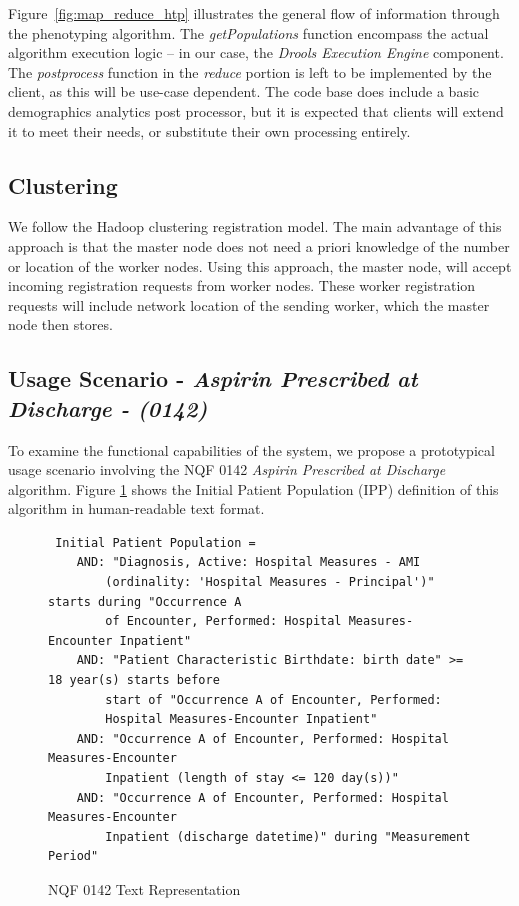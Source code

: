 \documentclass{amia}
\begin{document}
Figure~\ref{fig:map_reduce_htp} illustrates the general flow of information through the phenotyping algorithm. The \textit{getPopulations} function encompass the actual algorithm execution logic -- in our case, the \textit{Drools Execution Engine} component. The \textit{postprocess} function in the \textit{reduce} portion is left to be implemented by the client, as this will be use-case dependent. The code base does include a basic demographics analytics post processor, but it is expected that clients will extend it to meet their needs, or substitute their own processing entirely.

\subsection*{Clustering}
We follow the Hadoop clustering registration model\cite{wang2009hadoop}. The main advantage of this approach is that the master node does not need a priori knowledge of the number or location of the worker nodes. Using this approach, the master node, will accept incoming registration requests from worker nodes. These worker registration requests will include network location of the sending worker, which the master node then stores.

\subsection*{Usage Scenario - \textit{Aspirin Prescribed at Discharge - (0142)}}
To examine the functional capabilities of the system, we propose a prototypical usage scenario involving the NQF 0142 \textit{Aspirin Prescribed at Discharge} algorithm. Figure \ref{fig:0142_IPP_text} shows the Initial Patient Population (IPP) definition of this algorithm in human-readable text format.

\begin{figure}[H]
\begin{verbatim}
 Initial Patient Population =
    AND: "Diagnosis, Active: Hospital Measures - AMI 
        (ordinality: 'Hospital Measures - Principal')" starts during "Occurrence A
        of Encounter, Performed: Hospital Measures-Encounter Inpatient"
    AND: "Patient Characteristic Birthdate: birth date" >= 18 year(s) starts before
        start of "Occurrence A of Encounter, Performed: 
        Hospital Measures-Encounter Inpatient"
    AND: "Occurrence A of Encounter, Performed: Hospital Measures-Encounter
        Inpatient (length of stay <= 120 day(s))"
    AND: "Occurrence A of Encounter, Performed: Hospital Measures-Encounter
        Inpatient (discharge datetime)" during "Measurement Period"
\end{verbatim}
\caption{NQF 0142 Text Representation} 
\label{fig:0142_IPP_text}
\end{figure}
\end{document}
